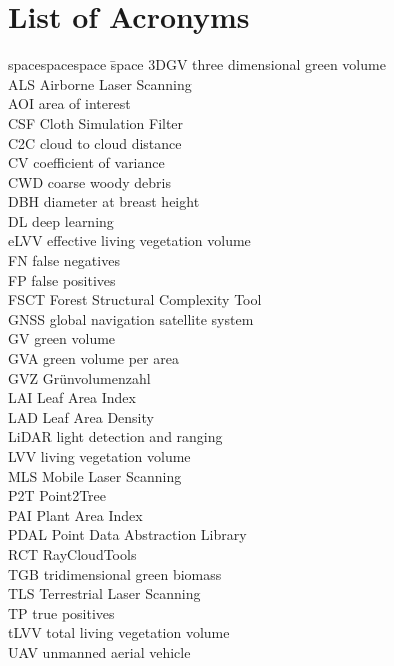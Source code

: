 \chapter{List of Acronyms}

\begin{tabbing}
spacespacespace \= space \kill
3DGV \> three dimensional green volume \\
ALS \> Airborne Laser Scanning \\
AOI \> area of interest \\
CSF \> Cloth Simulation Filter \\
C2C \> cloud to cloud distance \\
CV \> coefficient of variance \\
CWD \> coarse woody debris \\
DBH \> diameter at breast height \\
DL \> deep learning \\
eLVV \> effective living vegetation volume \\
FN \> false negatives \\
FP \> false positives \\
FSCT \> Forest Structural Complexity Tool \\
GNSS \> global navigation satellite system \\
GV \> green volume \\
GVA \> green volume per area \\
GVZ \> Grünvolumenzahl \\
LAI \> Leaf Area Index \\
LAD \> Leaf Area Density \\
LiDAR \> light detection and ranging \\
LVV \> living vegetation volume \\
MLS \> Mobile Laser Scanning \\
P2T \> Point2Tree \\
PAI \> Plant Area Index \\
PDAL \> Point Data Abstraction Library \\
RCT \> RayCloudTools \\
TGB \> tridimensional green biomass \\
TLS \> Terrestrial Laser Scanning \\
TP \> true positives \\
tLVV \> total living vegetation volume \\
UAV \> unmanned aerial vehicle \\

\end{tabbing}
